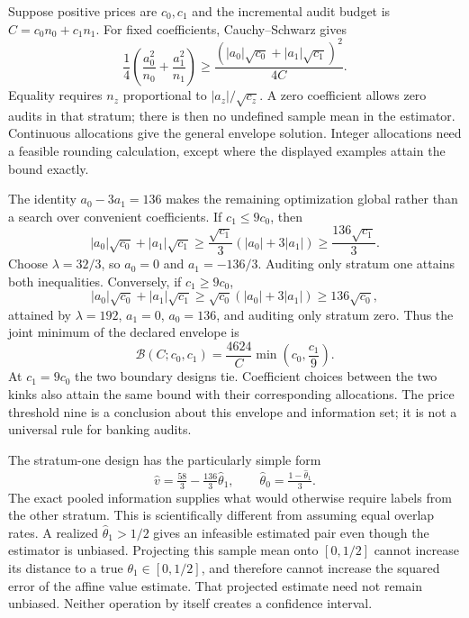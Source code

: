 Suppose positive prices are $c_0,c_1$ and the incremental audit budget is
$C=c_0n_0+c_1n_1$. For fixed coefficients, Cauchy--Schwarz gives
\begin{equation}
 \frac14\left(\frac{a_0^2}{n_0}+\frac{a_1^2}{n_1}\right)
 \geq \frac{\left(|a_0|\sqrt{c_0}+|a_1|\sqrt{c_1}\right)^2}{4C}.
 \label{exec17:s7-constrained-budget}
\end{equation}
Equality requires $n_z$ proportional to $|a_z|/\sqrt{c_z}$. A zero coefficient
allows zero audits in that stratum; there is then no undefined sample mean in
the estimator. Continuous allocations give the general envelope solution.
Integer allocations need a feasible rounding calculation, except where the
displayed examples attain the bound exactly.

The identity $a_0-3a_1=136$ makes the remaining optimization global rather
than a search over convenient coefficients. If $c_1\leq9c_0$, then
\begin{equation}
 |a_0|\sqrt{c_0}+|a_1|\sqrt{c_1}
 \geq \frac{\sqrt{c_1}}3(|a_0|+3|a_1|)
 \geq \frac{136\sqrt{c_1}}3.
 \label{exec17:s7-stratum1-proof}
\end{equation}
Choose $\lambda=32/3$, so $a_0=0$ and $a_1=-136/3$. Auditing only stratum
one attains both inequalities. Conversely, if $c_1\geq9c_0$,
\begin{equation}
 |a_0|\sqrt{c_0}+|a_1|\sqrt{c_1}
 \geq \sqrt{c_0}(|a_0|+3|a_1|)
 \geq136\sqrt{c_0},
 \label{exec17:s7-stratum0-proof}
\end{equation}
attained by $\lambda=192$, $a_1=0$, $a_0=136$, and auditing only stratum
zero. Thus the joint minimum of the declared envelope is
\begin{equation}
 \mathcal B(C;c_0,c_1)=\frac{4624}{C}
                  \min\left(c_0,\frac{c_1}{9}\right).
 \label{exec17:s7-constrained-optimum}
\end{equation}
At $c_1=9c_0$ the two boundary designs tie. Coefficient choices between the
two kinks also attain the same bound with their corresponding allocations.
The price threshold nine is a conclusion about this envelope and information
set; it is not a universal rule for banking audits.

The stratum-one design has the particularly simple form
\begin{equation}
 \widehat v=\tfrac{58}{3}-\tfrac{136}{3}\widehat\theta_1,
 \qquad
 \widehat\theta_0=\tfrac{1-\widehat\theta_1}{3}.
 \label{exec17:s7-one-stratum}
\end{equation}
The exact pooled information supplies what would otherwise require labels
from the other stratum. This is scientifically different from assuming equal
overlap rates. A realized $\widehat\theta_1>1/2$ gives an infeasible estimated
pair even though the estimator is unbiased. Projecting this sample mean onto
$[0,1/2]$ cannot increase its distance to a true $\theta_1\in[0,1/2]$, and
therefore cannot increase the squared error of the affine value estimate.
That projected estimate need not remain unbiased. Neither operation by itself
creates a confidence interval.

